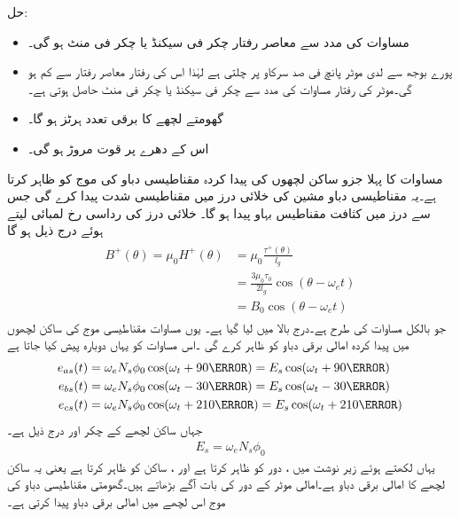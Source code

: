 حل:
\begin{itemize}
\item
مساوات   کی مدد سے معاصر رفتار  چکر فی سیکنڈ یا  چکر فی منٹ ہو گی۔
\item
پورے بوجھ سے لدی موٹر پانچ فی صد سرکاو پر چلتی ہے لہٰذا اس کی رفتار معاصر رفتار سے  کم ہو گی۔موٹر کی رفتار مساوات    کی مدد سے  چکر فی سیکنڈ یا  چکر فی منٹ حاصل ہوتی ہے۔
\item
گھومتے لچھے کا برقی تعدد   ہرٹز ہو گا۔
\item
اس کے دھرے پر قوت مروڑ  ہو گی۔
\end{itemize}
%
مساوات   کا پہلا جزو ساکن لچھوں کی پیدا کردہ مقناطیسی دباو کی موج  کو ظاہر کرتا ہے۔یہ مقناطیسی دباو مشین کی خلائی درز میں مقناطیسی شدت  پیدا کرے گی جس سے درز میں  کثافت مقناطیس بہاو  پیدا ہو گا۔ خلائی درز کی رداسی رخ  لمبائی  لیتے ہوئے درج ذیل ہو گا
\begin{gather}
\begin{aligned}\label{مساوات_امالی-سرک_تعلق_پ}
B^+(\theta)=\mu_0 H^+(\theta)&=\mu_0 \frac{\tau^+(\theta)}{l_g}\\
&=\frac{3 \mu_0 \tau_0}{2 l_g} \cos (\theta-\omega_e t)\\
&=B_0 \cos (\theta-\omega_e t)
\end{aligned}
\end{gather}
جو بالکل مساوات   کی طرح ہے۔درج بالا میں  لیا گیا ہے۔ یوں مساوات    مقناطیسی موج  کی ساکن لچھوں میں پیدا کردہ امالی برقی دباو کو ظاہر کرے گی ۔اس مساوات کو یہاں دوبارہ پیش کیا جاتا ہے
\begin{gather}
\begin{aligned}\label{مساوات_امالی_تین_دور_سائن_نما_برقی_دباو}
e_{as}(t)&=\omega_e N_s \phi_0 \cos (\omega_t +90\degree)=E_s \cos (\omega_t +90\degree)\\
e_{bs}(t)&=\omega_e N_s \phi_0 \cos (\omega_t -30\degree)=E_s \cos (\omega_t -30\degree)\\
e_{cs}(t)&=\omega_e N_s \phi_0 \cos (\omega_t +210\degree)=E_s \cos (\omega_t +210\degree)
\end{aligned}
\end{gather}
جہاں  ساکن لچھے کے چکر  اور  درج ذیل ہے۔
\begin{align}
E_s=\omega_e N_s \phi_0
\end{align}
یہاں   لکھتے ہوئے  زیر نوشت  میں  ،  دور  کو ظاہر کرتا ہے اور ، ساکن کو ظاہر کرتا ہے یعنی یہ ساکن   لچھے کا امالی برقی دباو ہے۔امالی موٹر کے  دور   کی بات آگے بڑھاتے ہیں۔گھومتی مقناطیسی دباو کی موج اس  لچھے میں امالی برقی دباو  پیدا کرتی ہے۔

